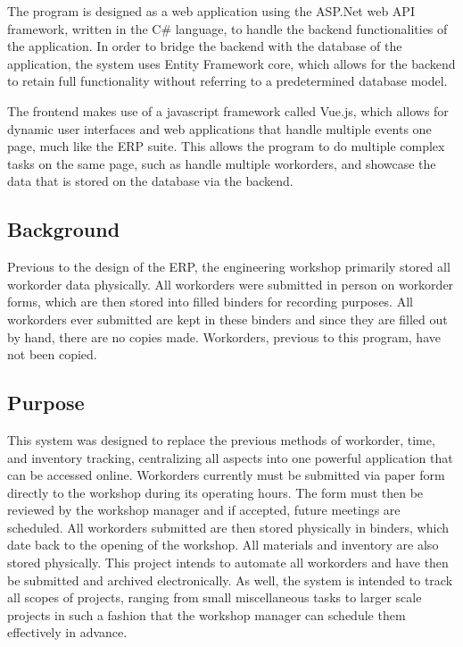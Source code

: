 The program is designed as a web application using the ASP.Net web API framework, written in the C\# language, to handle the backend functionalities of the application. In order to bridge the backend with the database of the application, the system uses Entity Framework core, which allows for the backend to retain full functionality without referring to a predetermined database model.
\newline
{\setlength{\parindent}{0cm}

The frontend makes use of a javascript framework called Vue.js, which allows for dynamic user interfaces and web applications that handle multiple events one page, much like the ERP suite. This allows the program to do multiple complex tasks on the same page, such as handle multiple workorders, and showcase the data that is stored on the database via the backend. 

\subsection{Background}
Previous to the design of the ERP, the engineering workshop primarily stored all workorder data physically. All workorders were submitted in person on workorder forms, which are then stored into filled binders for recording purposes. All workorders ever submitted are kept in these binders and since they are filled out by hand, there are no copies made. Workorders, previous to this program, have not been copied.

\subsection{Purpose}
This system was designed to replace the previous methods of workorder, time, and inventory tracking, centralizing all aspects into one powerful application that can be accessed online. Workorders currently must be submitted via paper form directly to the workshop during its operating hours. The form must then be reviewed by the workshop manager and if accepted, future meetings are scheduled. All workorders submitted are then stored physically in binders, which date back to the opening of the workshop. All materials and inventory are also stored physically. This project intends to automate all workorders and have then be submitted and archived electronically. As well, the system is intended to track all scopes of projects, ranging from small miscellaneous tasks to larger scale projects in such a fashion that the workshop manager can schedule them effectively in advance. 
}
